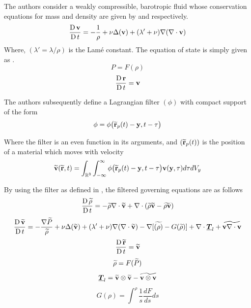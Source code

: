The authors consider a weakly compressible, barotropic fluid whose conservation equations for mass and density are given by  and  respectively.
\begin{equation}
    \frac{\operatorname{D} \mathbf{v}}{\operatorname{D} t} = -\frac{1}{\rho} + \nu \Delta(\mathbf{v}) + (\lambda' + \nu)\nabla(\nabla \cdot \mathbf{v})
    \label{eq:DiMascio2017-mom-governing}
\end{equation}
Where, $(\lambda' = \lambda/\rho)$ is the Lam\'e constant.
The equation of state is simply given as .
\begin{equation}
    P = F(\rho)
    \label{eq:DiMascio2017-eos}
\end{equation}
\begin{equation}
    \frac{\operatorname{D} \mathbf{r}}{\operatorname{D} t} = \mathbf{v}
    \label{eq:DiMascio2017-r-governing}
\end{equation}

The authors subsequently define a Lagrangian filter $(\phi)$ with compact support of the form
\begin{equation}
    \phi = \phi\big(\widetilde{\mathbf{r}}_p(t)-\mathbf{y}, t-\tau  \big)
    \label{eq:DiMascio2017-filter}
\end{equation}

Where the filter is an even function in its arguments, and $(\widetilde{\mathbf{r}}_p(t))$ is the position of a material which moves with velocity 
\begin{equation}
    \widetilde{\mathbf{v}}(\widetilde{\mathbf{r}}, t) = \int_{\mathbb{R}^3} \int_{-\infty}^{\infty} \phi \big(\widetilde{\mathbf{r}}_p(t)-\mathbf{y}, t-\tau  \big) \mathbf{v}(\mathbf{y}, \tau)d\tau dV_y
\end{equation}

By using the filter as defined in , the filtered governing equations are as follows
\begin{equation}
    \frac{\operatorname{D} \widetilde{\rho}}{\operatorname{D} t} = -\widetilde{\rho} \nabla \cdot \widetilde{\mathbf{v}} + \nabla \cdot (\widetilde{\rho}\widetilde{\mathbf{v}} - \widetilde{\rho \mathbf{v}})
\end{equation}
\begin{equation}
    \frac{\operatorname{D} \widetilde{\mathbf{v}}}{\operatorname{D} t} = - \frac{\nabla \widetilde{P}}{\widetilde{\rho}} + \nu \Delta(\widetilde{\mathbf{v}}) + (\lambda'+\nu)\nabla(\nabla\cdot\widetilde{\mathbf{v}}) - \nabla[\widetilde{(\rho)}-G(\widetilde{\rho})] + \nabla\cdot\underline{\bm{T}}_l+\widetilde{\mathbf{v}\nabla\cdot\mathbf{v}}
\end{equation}
\begin{equation}
    \frac{\operatorname{D} \widetilde{\mathbf{r}}}{\operatorname{D} t}=\widetilde{\mathbf{v}}
\end{equation}
\begin{equation}
    \widetilde{\rho} = F(\widetilde{P})
\end{equation}
\begin{equation}
    \underline{\bm{T}}_l = \widetilde{\mathbf{v}}\otimes\widetilde{\mathbf{v}} - \widetilde{\mathbf{v}\otimes\mathbf{v}}
\end{equation}
\begin{equation}
    G(\rho) = \int^{\rho} \frac{1}{s}\frac{dF}{ds}ds
\end{equation}

